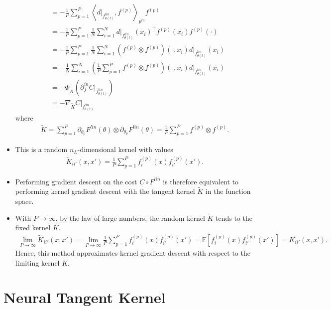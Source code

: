 \documentclass[10pt]{article}
\newcommand{\EE}{\mathbb{E}}
\newcommand{\inner}[2]{\left\langle #1, #2 \right\rangle}
\newcommand{\paran}[1]{{( #1 )}}
\newcommand{\pin}{{p^{in}}}
\newcommand{\din}{\partial^{in}}
\begin{document}
\begin{itemize}
\begin{align*}
&= -\frac{1}{P} \sum_{p = 1}^P \inner{d|_{f^{lin}_{\theta(t)}}}{f^\paran{p}}_{\pin} f^\paran{p} \\
&= -\frac{1}{P} \sum_{p = 1}^P \frac{1}{N} \sum_{i = 1}^N d|_{f^{lin}_{\theta(t)}}(x_i)^\top f^\paran{p}(x_i) f^\paran{p}(\cdot) \\
&= -\frac{1}{P} \sum_{p = 1}^P \frac{1}{N} \sum_{i = 1}^N (f^\paran{p} \otimes f^\paran{p})(\cdot,x_i) d|_{f^{lin}_{\theta(t)}}(x_i) \\
&= -\frac{1}{N} \sum_{i = 1}^N \left( \frac{1}{P} \sum_{p = 1}^P f^\paran{p} \otimes f^\paran{p} \right)(\cdot,x_i) d|_{f^{lin}_{\theta(t)}}(x_i) \\
&= -\Phi_{\tilde{K}}(\din_f C|_{f^{lin}_{\theta(t)}}) \\
&= -\nabla_{\tilde{K}} C|_{f^{lin}_{\theta(t)}}
\end{align*}
where
\begin{align*}
\tilde{K} = \sum_{p = 1}^P \partial_{\theta_p} F^{lin}(\theta) \otimes \partial_{\theta_p} F^{lin}(\theta) = \frac{1}{P} \sum_{p = 1}^P f^\paran{p} \otimes f^\paran{p}.
\end{align*}
\item This is a random $n_L$-dimensional kernel with values
\begin{align*}
\tilde{K}_{ii'}(x,x') = \frac{1}{P} \sum_{p = 1}^P f^\paran{p}_i(x) f^\paran{p}_{i'}(x').
\end{align*}
\item Performing gradient descent on the cost $C \circ F^{lin}$ is therefore equivalent to performing kernel gradient descent with the tangent kernel $\tilde{K}$ in the function space.
\item With $P \rightarrow \infty$, by the law of large numbers, the random kernel $\tilde{K}$ tends to the fixed kernel $K$.
\begin{align*}
\lim_{P \rightarrow \infty} \tilde{K}_{ii'}(x,x') = \lim_{P \rightarrow \infty} \frac{1}{P} \sum_{p = 1}^P f^\paran{p}_i(x) f^\paran{p}_{i'}(x') = \EE[f^\paran{p}_i(x) f^\paran{p}_{i'}(x')] = K_{ii'}(x,x').
\end{align*}
Hence, this method approximates kernel gradient descent with respect to the limiting kernel $K$.
\end{itemize}

\newpage

\section{Neural Tangent Kernel}
\end{document}
